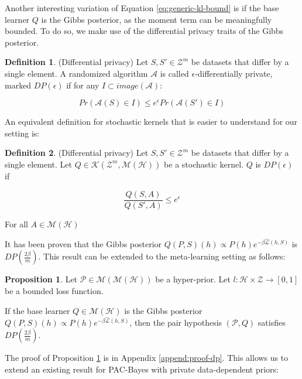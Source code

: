 \documentclass{article}
\theoremstyle{definition}
\newtheorem{defn}{Definition}[section]
\newtheorem{proposition}{Proposition}[section]
\begin{document}
Another interesting variation of Equation \ref{eq:generic-kl-bound} is if the base learner $Q$ is the Gibbs posterior, as the moment term can be meaningfully bounded. To do so, we make use of the differential privacy traits of the Gibbs posterior.

\begin{defn} (Differential privacy)
	Let $S,S'\in \mathcal{Z}^m$ be datasets that differ by a single element.
	A randomized algorithm $\mathcal{A}$ is called  $\epsilon$-differentially private, marked $DP(\epsilon)$ if for any $I\subset image(\mathcal{A})$:
	
	$$Pr(\mathcal{A}(S)\in I)\leq e^\epsilon Pr(\mathcal{A}(S')\in I)$$
\end{defn}

An equivalent definition for stochastic kernels that is easier to understand for our setting is:

\begin{defn} (Differential privacy)
	Let $S,S'\in \mathcal{Z}^m$ be datasets that differ by a single element.
	Let $Q\in \mathcal{K}(\mathcal{Z}^m, \mathcal{M}(\mathcal{H}))$ be a stochastic kernel.
	$Q$ is $DP(\epsilon)$ if 
	
	$$\frac{Q(S, A)}{Q(S', A)} \leq e^\epsilon$$
	
	For all $A\in  \mathcal{M}(\mathcal{H})$
\end{defn}

It has been proven \citep{McSherry2007, Rivasplata2020} that the Gibbs posterior $Q(P, S)(h)\propto P(h)e^{-\beta\hat{\mathcal{L}}(h, S)}$ is $DP\left (\frac{2\beta}{m}\right )$.
This result can be extended to the meta-learning setting as follows:

\begin{proposition} \label{thm:pair-is-dp}
	Let $\mathcal{P}\in \mathcal{M}(\mathcal{M}(\mathcal{H}))$ be a hyper-prior.
	Let $l:\mathcal{H}\times \mathcal{Z}\rightarrow [0,1]$ be a bounded loss function.
	
	If the base learner $Q\in \mathcal{M}(\mathcal{H})$ is the Gibbs posterior $Q(P, S)(h)\propto P(h)e^{-\beta\hat{\mathcal{L}}(h, S)}$, 
	then the pair hypothesis $(\mathcal{P}, Q)$ satisfies $DP\left (\frac{2\beta}{m}\right )$.
\end{proposition}

The proof of Proposition \ref{thm:pair-is-dp} is in Appendix \ref{append:proof-dp}. This  allows us to extend an existing result for PAC-Bayes with private data-dependent priors:
\end{document}
